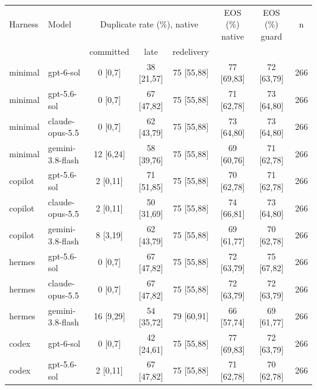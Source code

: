 \begin{tabular}{llcccccc}
\toprule
Harness & Model & \multicolumn{3}{c}{Duplicate rate (\%), native} & EOS (\%) native & EOS (\%) guard & n \\
 & & committed & late & redelivery & & & \\
\midrule
minimal & gpt-6-sol & 0 {\scriptsize[0,7]} & 38 {\scriptsize[21,57]} & 75 {\scriptsize[55,88]} & 77 {\scriptsize[69,83]} & 72 {\scriptsize[63,79]} & 266 \\
minimal & gpt-5.6-sol & 0 {\scriptsize[0,7]} & 67 {\scriptsize[47,82]} & 75 {\scriptsize[55,88]} & 71 {\scriptsize[62,78]} & 73 {\scriptsize[64,80]} & 266 \\
minimal & claude-opus-5.5 & 0 {\scriptsize[0,7]} & 62 {\scriptsize[43,79]} & 75 {\scriptsize[55,88]} & 73 {\scriptsize[64,80]} & 73 {\scriptsize[64,80]} & 266 \\
minimal & gemini-3.8-flash & 12 {\scriptsize[6,24]} & 58 {\scriptsize[39,76]} & 75 {\scriptsize[55,88]} & 69 {\scriptsize[60,76]} & 71 {\scriptsize[62,78]} & 266 \\
\midrule
copilot & gpt-5.6-sol & 2 {\scriptsize[0,11]} & 71 {\scriptsize[51,85]} & 75 {\scriptsize[55,88]} & 70 {\scriptsize[62,78]} & 71 {\scriptsize[62,78]} & 266 \\
copilot & claude-opus-5.5 & 2 {\scriptsize[0,11]} & 50 {\scriptsize[31,69]} & 75 {\scriptsize[55,88]} & 74 {\scriptsize[66,81]} & 73 {\scriptsize[64,80]} & 266 \\
copilot & gemini-3.8-flash & 8 {\scriptsize[3,19]} & 62 {\scriptsize[43,79]} & 75 {\scriptsize[55,88]} & 69 {\scriptsize[61,77]} & 70 {\scriptsize[62,78]} & 266 \\
\midrule
hermes & gpt-5.6-sol & 0 {\scriptsize[0,7]} & 67 {\scriptsize[47,82]} & 75 {\scriptsize[55,88]} & 72 {\scriptsize[63,79]} & 75 {\scriptsize[67,82]} & 266 \\
hermes & claude-opus-5.5 & 0 {\scriptsize[0,7]} & 67 {\scriptsize[47,82]} & 75 {\scriptsize[55,88]} & 72 {\scriptsize[63,79]} & 72 {\scriptsize[63,79]} & 266 \\
hermes & gemini-3.8-flash & 16 {\scriptsize[9,29]} & 54 {\scriptsize[35,72]} & 79 {\scriptsize[60,91]} & 66 {\scriptsize[57,74]} & 69 {\scriptsize[61,77]} & 266 \\
\midrule
codex & gpt-6-sol & 0 {\scriptsize[0,7]} & 42 {\scriptsize[24,61]} & 75 {\scriptsize[55,88]} & 77 {\scriptsize[69,83]} & 72 {\scriptsize[63,79]} & 266 \\
codex & gpt-5.6-sol & 2 {\scriptsize[0,11]} & 67 {\scriptsize[47,82]} & 75 {\scriptsize[55,88]} & 71 {\scriptsize[62,78]} & 70 {\scriptsize[62,78]} & 266 \\
\bottomrule
\end{tabular}